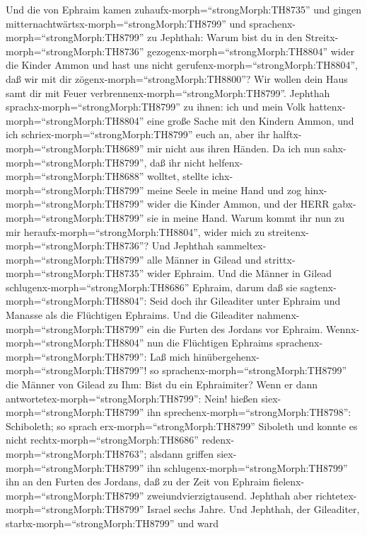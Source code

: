  Und die von Ephraim kamen
zuhaufx-morph=``strongMorph:TH8735'' und gingen
mitternachtwärtsx-morph=``strongMorph:TH8799'' und
sprachenx-morph=``strongMorph:TH8799'' zu Jephthah: Warum bist du in den
Streitx-morph=``strongMorph:TH8736''
gezogenx-morph=``strongMorph:TH8804'' wider die Kinder Ammon und hast
uns nicht gerufenx-morph=``strongMorph:TH8804'', daß wir mit dir
zögenx-morph=``strongMorph:TH8800''? Wir wollen dein Haus samt dir mit
Feuer verbrennenx-morph=``strongMorph:TH8799''.  Jephthah
sprachx-morph=``strongMorph:TH8799'' zu ihnen: ich und mein Volk
hattenx-morph=``strongMorph:TH8804'' eine große Sache mit den Kindern
Ammon, und ich schriex-morph=``strongMorph:TH8799'' euch an, aber ihr
halftx-morph=``strongMorph:TH8689'' mir nicht aus ihren Händen.
 Da ich nun sahx-morph=``strongMorph:TH8799'', daß ihr nicht
helfenx-morph=``strongMorph:TH8688'' wolltet, stellte
ichx-morph=``strongMorph:TH8799'' meine Seele in meine Hand und zog
hinx-morph=``strongMorph:TH8799'' wider die Kinder Ammon, und der HERR
gabx-morph=``strongMorph:TH8799'' sie in meine Hand. Warum kommt ihr nun
zu mir heraufx-morph=``strongMorph:TH8804'', wider mich zu
streitenx-morph=``strongMorph:TH8736''?  Und Jephthah
sammeltex-morph=``strongMorph:TH8799'' alle Männer in Gilead und
strittx-morph=``strongMorph:TH8735'' wider Ephraim. Und die Männer in
Gilead schlugenx-morph=``strongMorph:TH8686'' Ephraim, darum daß sie
sagtenx-morph=``strongMorph:TH8804'': Seid doch ihr Gileaditer unter
Ephraim und Manasse als die Flüchtigen Ephraims.  Und die
Gileaditer nahmenx-morph=``strongMorph:TH8799'' ein die Furten des
Jordans vor Ephraim. Wennx-morph=``strongMorph:TH8804'' nun die
Flüchtigen Ephraims sprachenx-morph=``strongMorph:TH8799'': Laß mich
hinübergehenx-morph=``strongMorph:TH8799''! so
sprachenx-morph=``strongMorph:TH8799'' die Männer von Gilead zu Ihm:
Bist du ein Ephraimiter? Wenn er dann
antwortetex-morph=``strongMorph:TH8799'': Nein!  hießen
siex-morph=``strongMorph:TH8799'' ihn
sprechenx-morph=``strongMorph:TH8798'': Schiboleth; so sprach
erx-morph=``strongMorph:TH8799'' Siboleth und konnte es nicht
rechtx-morph=``strongMorph:TH8686'' redenx-morph=``strongMorph:TH8763'';
alsdann griffen siex-morph=``strongMorph:TH8799'' ihn
schlugenx-morph=``strongMorph:TH8799'' ihn an den Furten des Jordans,
daß zu der Zeit von Ephraim fielenx-morph=``strongMorph:TH8799''
zweiundvierzigtausend.  Jephthah aber
richtetex-morph=``strongMorph:TH8799'' Israel sechs Jahre. Und Jephthah,
der Gileaditer, starbx-morph=``strongMorph:TH8799'' und ward
